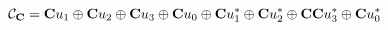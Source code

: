 \begin{equation}
{\cal C}_{\bf C}={\bf C}u_{1} \oplus {\bf C}u_{2} \oplus {\bf C}u_{3} \oplus 
{\bf C}u_{0} 
\oplus {\bf C}u_{1}^{*} \oplus {\bf C}u_{2}^{*} \oplus {\bf C}
{\bf C}
u_{3}^{*} \oplus {\bf C}
u_{0}^{*}  
\end{equation}

